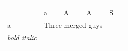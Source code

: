 \documentclass{article}
\begin{document}
	\begin{table}
		\begin{tabular}{@{} l l l l l l @{}}
			  &  &  &  &  &  \\

			  & a & A & A & S &  \\

			 a & \multicolumn{3}{l}{Three merged guys} &  &  \\

			 \emph{bold italic} &  &  &  &  &  \\

			\hline  &  &  &  &  &  \\


		\end{tabular}
	\end{table}
\end{document}
